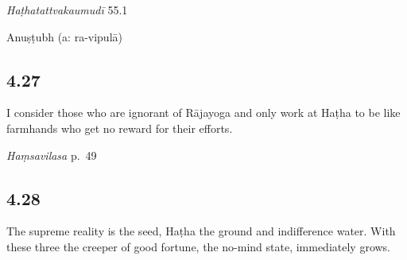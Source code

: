 \begin{ekdosis}
\begin{testimonia}[hp04_026]
\emph{Haṭhatattvakaumudī} 55.1
\begin{versinnote}
\end{versinnote}
\end{testimonia}


\begin{metre}[hp04_026]
Anuṣṭubh (a: ra-vipulā)
\end{metre}

\subsection*{4.27}
\begin{translation}[hp04_027]
I consider those who are ignorant of Rājayoga and only work at Haṭha to be like farmhands who get no reward for their efforts.%
\end{translation}


\begin{testimonia}[hp04_027]
\emph{Haṃsavilasa} p.~49
\begin{versinnote}
\end{versinnote}
\end{testimonia}


\subsection*{4.28}
\begin{translation}[hp04_028]
The supreme reality is the seed, Haṭha the ground and indifference water. With these three the creeper of good fortune, the no-mind state, immediately grows.
\end{translation}


\end{ekdosis}
